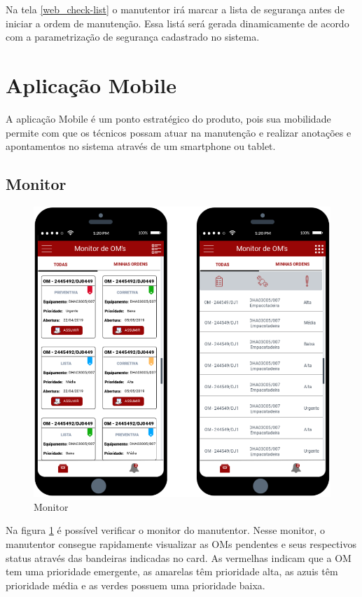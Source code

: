 Na tela \ref{web_check-list} o manutentor irá marcar a lista de segurança antes de iniciar a ordem de manutenção. Essa listá será gerada dinamicamente de acordo com a parametrização de segurança cadastrado no sistema.

\section{Aplicação Mobile}
A aplicação Mobile é um ponto estratégico do produto, pois sua mobilidade permite com que os técnicos possam atuar na manutenção e realizar anotações e apontamentos no sistema através de um smartphone ou tablet.

\subsection{Monitor}

\begin{figure}[htb]
	\caption{\label{mobile_monitor}Monitor}
	\begin{center}
		\includegraphics[scale=0.75]{./Figuras/mobile/monitor.png}
	\end{center}
\end{figure}

Na figura \ref{mobile_monitor} é possível verificar o monitor do manutentor. Nesse monitor, o manutentor consegue rapidamente visualizar as OMs pendentes e seus respectivos status através das bandeiras indicadas no card. As  vermelhas indicam que a OM tem uma prioridade emergente, as amarelas têm prioridade alta, as azuis têm prioridade média e as verdes possuem uma prioridade baixa.


